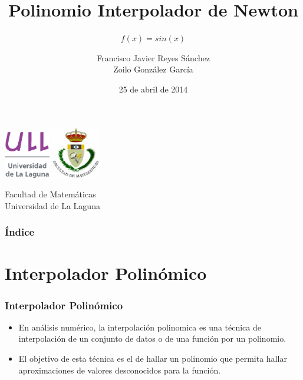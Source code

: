 \documentclass{beamer}
\title[Presentación con Beamer]{Polinomio Interpolador de Newton}
\subtitle[Presentación con Beamer]{$f(x)=sin(x)$}
\author[Técnicas Experimentales]{Francisco Javier Reyes Sánchez \\Zoilo González García}
\date[25-03-2014]{25 de abril de 2014}
\begin{document}
  
\begin{frame}

  \includegraphics[width=0.15\textwidth]{img/ullesc}
  \hspace*{7.0cm}
  \includegraphics[width=0.16\textwidth]{img/fmatesc}
  \titlepage

  \begin{small}
    \begin{center}
     Facultad de Matemáticas \\
     Universidad de La Laguna
    \end{center}
  \end{small}

\end{frame}

\begin{frame}
  \frametitle{Índice}  
  \tableofcontents[pausesections]
\end{frame}


\section{Interpolador Polinómico}


\begin{frame}

\frametitle{Interpolador Polinómico}

 \begin{itemize}
 \item
    En análisis numérico, la interpolación polinomica es una técnica de interpolación de un conjunto de datos o de una función por un polinomio. 
 \item
    El objetivo de esta técnica es el de hallar un polinomio que permita hallar aproximaciones de valores desconocidos para la función.
  \end{itemize}

\end{frame}
\end{document}
